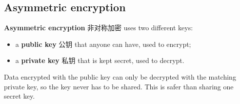 \documentclass[11pt]{article}
\begin{document}
\subsection*{Asymmetric encryption}

\textbf{Asymmetric encryption} 非对称加密 uses two different keys:

\begin{itemize}
\item a \textbf{public key} 公钥 that anyone can have, used to encrypt;

\item a \textbf{private key} 私钥 that is kept secret, used to decrypt.

\end{itemize}

Data encrypted with the public key can only be decrypted with the matching private key, so the key never has to be shared. This is safer than sharing one secret key.
\end{document}
